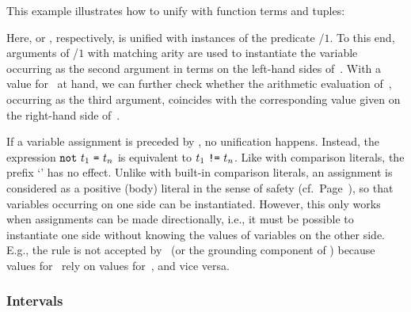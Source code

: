 \begin{example}\label{ex:unify}
This example illustrates how to unify with function terms and tuples:
%

%
Here,  or
, respectively,
is unified with instances of the predicate /$1$.
To this end,
arguments of /$1$ with matching arity
are used to instantiate the variable~ occurring
as the second argument in terms on the left-hand sides of~\code{=}.
With a value for~ at hand,
we can further check whether the arithmetic evaluation of~,
occurring as the third argument, coincides with the
corresponding value given on the right-hand side of~\code{=}.
%
\end{example}

\begin{note}
If a variable assignment is preceded by ,
no unification happens.
Instead, the expression $\texttt{not}~t_1~\texttt{=}~t_n$ is equivalent to $t_1~\texttt{!=}~t_n$.
Like with comparison literals, the prefix `' has no effect.
Unlike with built-in comparison literals,
an assignment is considered as
a positive (body) literal in the sense of safety (cf.\ Page~\pageref{pg:safe}),
so that variables occurring on one side can be instantiated.
However, this only works when assignments
can be made directionally, i.e.,
it must be possible to instantiate one side
without knowing the values of variables on
the other side.
E.g., the rule  
is not accepted by \gringo\ (or the grounding component of \clingo)
because values for~ rely on values for~, and vice versa.
%
\end{note}

\subsubsection{Intervals}\label{subsec:gringo:interval}

